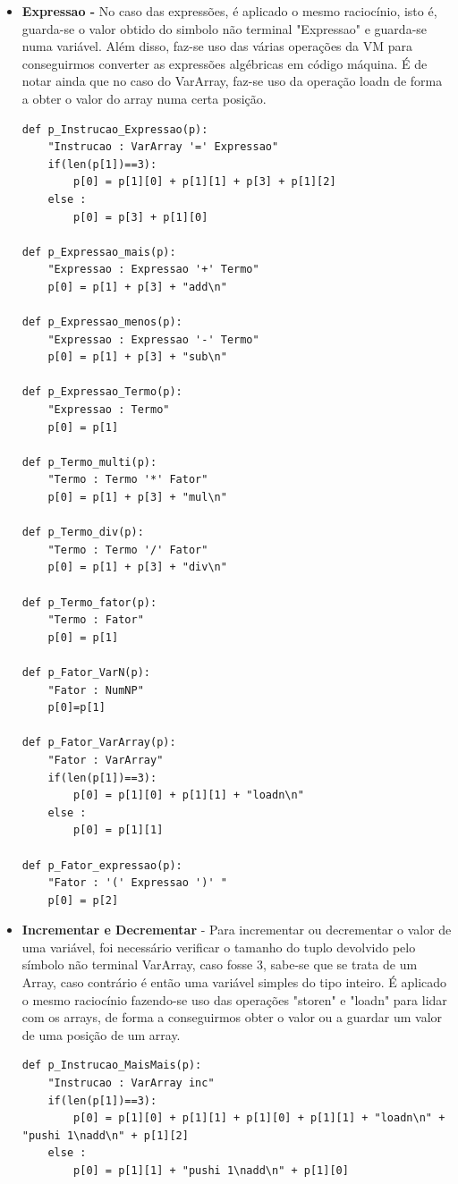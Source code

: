 \documentclass[11pt,a4paper]{report}
\begin{document}
\begin{itemize}
\item \textbf{Expressao -} No caso das expressões, é aplicado o mesmo raciocínio, isto é, guarda-se o valor obtido do simbolo não terminal "Expressao" e guarda-se numa variável. Além disso, faz-se uso das várias operações da VM para conseguirmos converter as expressões algébricas em código máquina. É de notar ainda que no caso do VarArray, faz-se uso da operação loadn de forma a obter o valor do array numa certa posição.
\begin {verbatim}
def p_Instrucao_Expressao(p):
    "Instrucao : VarArray '=' Expressao"
    if(len(p[1])==3):
        p[0] = p[1][0] + p[1][1] + p[3] + p[1][2]
    else :
        p[0] = p[3] + p[1][0]

def p_Expressao_mais(p):
    "Expressao : Expressao '+' Termo"
    p[0] = p[1] + p[3] + "add\n"

def p_Expressao_menos(p):
    "Expressao : Expressao '-' Termo"
    p[0] = p[1] + p[3] + "sub\n"

def p_Expressao_Termo(p):
    "Expressao : Termo"
    p[0] = p[1]

def p_Termo_multi(p):
    "Termo : Termo '*' Fator"
    p[0] = p[1] + p[3] + "mul\n"
  
def p_Termo_div(p):
    "Termo : Termo '/' Fator"
    p[0] = p[1] + p[3] + "div\n"

def p_Termo_fator(p):
    "Termo : Fator"
    p[0] = p[1]
  
def p_Fator_VarN(p):
    "Fator : NumNP"
    p[0]=p[1]

def p_Fator_VarArray(p):
    "Fator : VarArray"
    if(len(p[1])==3):
        p[0] = p[1][0] + p[1][1] + "loadn\n"
    else :
        p[0] = p[1][1]

def p_Fator_expressao(p):
    "Fator : '(' Expressao ')' "
    p[0] = p[2]
\end{verbatim}
        
\item \textbf{Incrementar e Decrementar} - Para incrementar ou decrementar o valor de uma variável, foi necessário verificar o tamanho do tuplo devolvido pelo símbolo não terminal VarArray, caso fosse 3, sabe-se que se trata de um Array, caso contrário é então uma variável simples do tipo inteiro. É aplicado o mesmo raciocínio fazendo-se uso das operações "storen" e "loadn" para lidar com os arrays, de forma a conseguirmos obter o valor ou a guardar um valor de uma posição de um array.
\begin {verbatim}
def p_Instrucao_MaisMais(p):
    "Instrucao : VarArray inc"
    if(len(p[1])==3):
        p[0] = p[1][0] + p[1][1] + p[1][0] + p[1][1] + "loadn\n" + "pushi 1\nadd\n" + p[1][2]
    else :
        p[0] = p[1][1] + "pushi 1\nadd\n" + p[1][0]



\end{verbatim}
\end{itemize}
\end{document}
